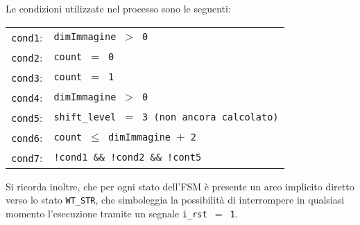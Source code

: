 \documentclass{article}
\begin{document}
Le condizioni utilizzate nel processo sono le seguenti:

\begin{center}
    \begin{tabular}{ll}
    \texttt{cond1}: & \texttt{dimImmagine $>$ 0}\\
    \texttt{cond2}: & \texttt{count $=$ 0} \\
    \texttt{cond3}: & \texttt{count $=$ 1} \\
    \texttt{cond4}: & \texttt{dimImmagine $>$ 0} \\
    \texttt{cond5}: & \texttt{shift\_level $=$ 3 (non ancora calcolato)} \\
    \texttt{cond6}: & \texttt{count $\leq$ dimImmagine $+$ 2} \\
    \texttt{cond7}: & \texttt{!cond1 \&\& !cond2 \&\& !cont5} \\    
\end{tabular}
\end{center}

Si ricorda inoltre, che per ogni stato dell'FSM è presente un arco implicito diretto verso lo stato \texttt{WT\_STR}, 
che simboleggia la possibilità di interrompere in qualsiasi momento l'esecuzione tramite un segnale \texttt{i\_rst $=$ 1}.
\end{document}
